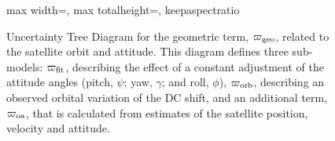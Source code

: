 \begin{figure}[p]
\begin{adjustbox}{max width=\textwidth, max totalheight=\textheight, keepaspectratio}
  \end{adjustbox}
  \caption{Uncertainty Tree Diagram for the geometric term, $\varpi_{\rm geo}$, related to the satellite orbit and attitude. This diagram defines three sub-models: $\varpi_{\rm fit}$, describing the effect of a constant adjustment of the attitude angles (pitch, $\psi$; yaw, $\gamma$; and roll, $\phi$), $\varpi_{\rm orb}$, describing an observed orbital variation of the DC shift, and an additional term, $\varpi_{\rm oa}$, that is calculated from estimates of the satellite position, velocity and attitude.}
  \label{fig:utd_varpi_geo}
\end{figure}
